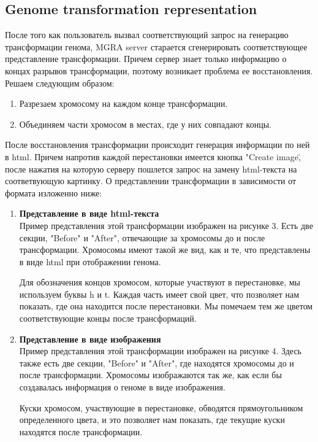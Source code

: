 \documentclass{article}
\begin{document}
\subsection{Genome transformation representation}
После того как пользователь вызвал соответствующий запрос на генерацию трансформации генома, MGRA server старается сгенерировать соответствующее представление трансформации. 
Причем сервер знает только информацию о концах разрывов трансформации, поэтому возникает проблема ее восстановления. Решаем следующим образом: 
\begin{enumerate}
	\item Разрезаем хромосому на каждом конце трансформации.
	\item Объединяем части хромосом в местах, где у них совпадают концы.
\end{enumerate}После восстановления трансформации происходит генерация информации по ней в html. Причем напротив каждой перестановки имеется кнопка "Create image\", после нажатия на которую серверу пошлется запрос на замену html-текста на соответвующую картинку.  О представлении трансформации в зависимости от формата изложенно ниже:  
\begin{enumerate}
	\item \textbf{Представление в виде html-текста} \\
		
Пример представления этой трансформации изображен на рисунке 3. 
		Есть две секции, "Before" и "After", отвечающие за хромосомы до и после
 трансформации. Хромосомы имеют такой же вид, как и те, что представлены в виде html при отображении генома.
 
Для обозначения концов хромосом, которые участвуют в перестановке, мы используем буквы h и t. Каждая часть имеет свой цвет, что позволяет нам показать,
 где она находится после перестановки. Мы помечаем тем же цветом соответствующие концы после трансформаций. \\
	\item \textbf{Представление в виде изображения} \\


		Пример представления этой трансформации изображен на рисунке 4.
		Здесь также есть две секции, "Before" и "After", где находятся
 хромосомы до и после трансформации. Хромосомы изображаются так же, как если бы создавалась информация о геноме в виде изображения.  	
		
Куски хромосом, участвующие в перестановке, обводятся прямоугольником определенного цвета, и это позволяет нам показать, где текущие куски находятся после 
трансформации.\\ 
\end{enumerate}
\end{document}
